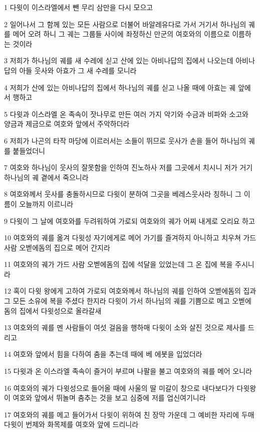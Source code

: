 \par 1 다윗이 이스라엘에서 뺀 무리 삼만을 다시 모으고
\par 2 일어나서 그 함께 있는 모든 사람으로 더불어 바알레유다로 가서 거기서 하나님의 궤를 메어 오려 하니 그 궤는 그룹들 사이에 좌정하신 만군의 여호와의 이름으로 이름하는 것이라
\par 3 저희가 하나님의 궤를 새 수레에 싣고 산에 있는 아비나답의 집에서 나오는데 아비나답의 아들 웃사와 아효가 그 새 수레를 모니라
\par 4 저희가 산에 있는 아비나답의 집에서 하나님의 궤를 싣고 나올 때에 아효는 궤 앞에서 행하고
\par 5 다윗과 이스라엘 온 족속이 잣나무로 만든 여러 가지 악기와 수금과 비파와 소고와 양금과 제금으로 여호와 앞에서 주악하더라
\par 6 저희가 나곤의 타작 마당에 이르러서는 소들이 뛰므로 웃사가 손을 들어 하나님의 궤를 붙들었더니
\par 7 여호와 하나님이 웃사의 잘못함을 인하여 진노하사 저를 그곳에서 치시니 저가 거기 하나님의 궤 곁에서 죽으니라
\par 8 여호와께서 웃사를 충돌하시므로 다윗이 분하여 그곳을 베레스웃사라 칭하니 그 이름이 오늘까지 이르니라
\par 9 다윗이 그 날에 여호와를 두려워하여 가로되 여호와의 궤가 어찌 내게로 오리요 하고
\par 10 여호와의 궤를 옮겨 다윗성 자기에게로 메어 가기를 즐겨하지 아니하고 치우쳐 가드 사람 오벧에돔의 집으로 메어 간지라
\par 11 여호와의 궤가 가드 사람 오벧에돔의 집에 석달을 있었는데 그 온 집에 복을 주시니라
\par 12 혹이 다윗 왕에게 고하여 가로되 여호와께서 하나님의 궤를 인하여 오벧에돔의 집과 그 모든 소유에 복을 주셨다 한지라 다윗이 가서 하나님의 궤를 기쁨으로 메고 오벧에돔의 집에서 다윗성으로 올라갈새
\par 13 여호와의 궤를 멘 사람들이 여섯 걸음을 행하매 다윗이 소와 살진 것으로 제사를 드리고
\par 14 여호와 앞에서 힘을 다하여 춤을 추는데 때에 베 에봇을 입었더라
\par 15 다윗과 온 이스라엘 족속이 즐거이 부르며 나팔을 불고 여호와의 궤를 메어 오니라
\par 16 여호와의 궤가 다윗성으로 들어올 때에 사울의 딸 미갈이 창으로 내다보다가 다윗왕이 여호와 앞에서 뛰놀며 춤추는 것을 보고 심중에 저를 업신여기니라
\par 17 여호와의 궤를 메고 들어가서 다윗이 위하여 친 장막 가운데 그 예비한 자리에 두매 다윗이 번제와 화목제를 여호와 앞에 드리니라
